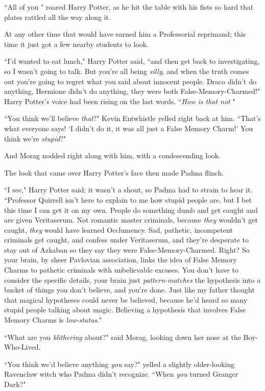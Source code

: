 ``All of you " roared Harry Potter, as he hit the table with his fists so hard that plates rattled all the way along it.

At any other time that would have earned him a Professorial reprimand; this time it just got a few nearby students to look.

``I'd wanted to eat lunch," Harry Potter said, ``and then get back to investigating, so I wasn't going to talk. But you're all being \emph{silly}, and when the truth comes out you're going to regret what you said about innocent people. Draco didn't do anything, Hermione didn't do anything, they were both False-Memory-Charmed!" Harry Potter's voice had been rising on the last words. ``\emph{How is that not }"

``You think we'll believe \emph{that}?" Kevin Entwhistle yelled right back at him. ``That's what everyone says! `I didn't do it, it was all just a False Memory Charm!' You think we're \emph{stupid}?"

And Morag nodded right along with him, with a condescending look.

The look that came over Harry Potter's face then made Padma flinch.

``I see," Harry Potter said; it wasn't a shout, so Padma had to strain to hear it. ``Professor Quirrell isn't here to explain to me how stupid people are, but I bet this time I can get it on my own. People do something dumb and get caught and are given Veritaserum. Not romantic master criminals, because \emph{they} wouldn't get caught, \emph{they} would have learned Occlumency. Sad, pathetic, incompetent criminals get caught, and confess under Veritaserum, and they're desperate to stay out of Azkaban so they say they were False-Memory-Charmed. Right? So your brain, by sheer Pavlovian association, links the idea of False Memory Charms to pathetic criminals with unbelievable excuses. You don't have to consider the specific details, your brain just \emph{pattern-matches} the hypothesis into a bucket of things you don't believe, and you're done. Just like my father thought that magical hypotheses could never be believed, because he'd heard so many stupid people talking about magic. Believing a hypothesis that involves False Memory Charms is \emph{low-status}."

``What are you \emph{blithering} about?" said Morag, looking down her nose at the Boy-Who-Lived.

``You think we'd believe anything \emph{you} say?" yelled a slightly older-looking Ravenclaw witch who Padma didn't recognize. ``When \emph{you} turned Granger Dark?"

